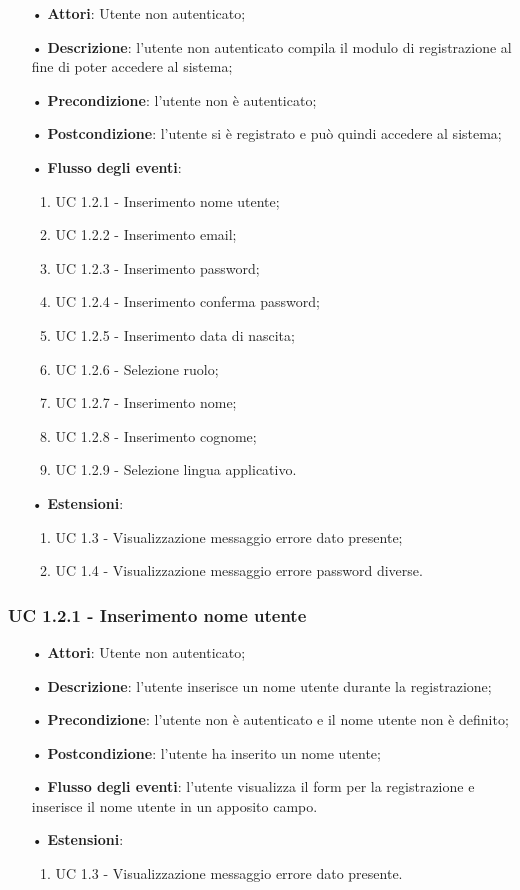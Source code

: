 \begin{itemize}
	\item[•]\textbf{Attori}: Utente non autenticato;
	\item[•]\textbf{Descrizione}: l'utente non autenticato compila il modulo di registrazione al fine di poter accedere al sistema;
	\item[•]\textbf{Precondizione}: l'utente non è autenticato;
	\item[•]\textbf{Postcondizione}: l'utente si è registrato e può quindi accedere al sistema;
	\item[•]\textbf{Flusso degli eventi}:
	\begin{enumerate}
		\item UC 1.2.1 - Inserimento nome utente;
		\item UC 1.2.2 - Inserimento email;
		\item UC 1.2.3 - Inserimento password;
		\item UC 1.2.4 - Inserimento conferma password;
		\item UC 1.2.5 - Inserimento data di nascita;
		\item UC 1.2.6 - Selezione ruolo;
		\item UC 1.2.7 - Inserimento nome;
		\item UC 1.2.8 - Inserimento cognome;
		\item UC 1.2.9 - Selezione lingua applicativo.	
	\end{enumerate}
	\item[•]\textbf{Estensioni}:
	\begin{enumerate}
		\item UC 1.3 - Visualizzazione messaggio errore dato presente;
		\item UC 1.4 - Visualizzazione messaggio errore password diverse.
	\end{enumerate}
\end{itemize}

\subsubsection{UC 1.2.1 - Inserimento nome utente}
\begin{itemize}
	\item[•]\textbf{Attori}: Utente non autenticato;
	\item[•]\textbf{Descrizione}: l'utente inserisce un nome utente durante la registrazione;
	\item[•]\textbf{Precondizione}: l'utente non è autenticato e il nome utente non è definito;
	\item[•]\textbf{Postcondizione}: l'utente ha inserito un nome utente;
	\item[•]\textbf{Flusso degli eventi}: l'utente visualizza il form per la registrazione e inserisce il nome utente in un apposito campo.
	\item[•] \textbf{Estensioni}:
	\begin{enumerate}
		\item UC 1.3 - Visualizzazione messaggio errore dato presente.
	\end{enumerate}
\end{itemize}

